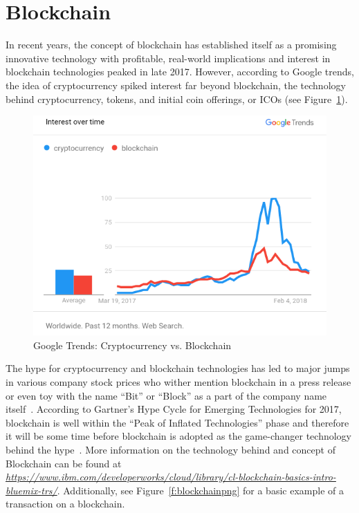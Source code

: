 \section{Blockchain}
In recent years, the concept of blockchain has established itself as a promising innovative technology with profitable, real-world implications and interest in blockchain technologies peaked in late 2017. However, according to Google trends, the idea of cryptocurrency spiked interest far beyond blockchain, the technology behind cryptocurrency, tokens, and initial coin offerings, or ICOs (see Figure~\ref{f:googletrendchart}). 
\begin{figure}[!ht]
  \centering\includegraphics[width=\columnwidth]{../images/trendscryptoblockchain.png}
  \caption{Google Trends: Cryptocurrency vs. Blockchain~\cite{GoogleTrendsCrypto-Blockchain}}\label{f:googletrendchart}
\end{figure}
The hype for cryptocurrency and blockchain technologies has led to major jumps in various company stock prices who wither mention blockchain in a press release or even toy with the name ``Bit'' or ``Block'' as a part of the company name itself~\cite{ReutersKodak}. According to Gartner's Hype Cycle for Emerging Technologies for 2017, blockchain is well within the ``Peak of Inflated Technologies'' phase and therefore it will be some time before blockchain is adopted as the game-changer technology behind the hype~\cite{GartnerHypeTechnology2017}. More information on the technology behind and concept of Blockchain can be found at \textit{\url{https://www.ibm.com/developerworks/cloud/library/cl-blockchain-basics-intro-bluemix-trs/}}. Additionally, see Figure~\ref{f:blockchainpng} for a basic example of a transaction on a blockchain.

